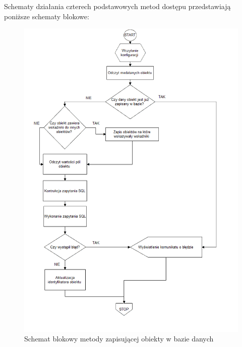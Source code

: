 \documentclass[12pt]{report}
\begin{document}
Schematy działania czterech podstawowych metod dostępu przedstawiają po\-niższe schematy blokowe:

\newpage
\begin{figure}[H]
\centering
\includegraphics[width=\textwidth]{resources/store_schema.png}
\caption{Schemat blokowy metody zapisującej obiekty w bazie danych}
\end{figure}
\end{document}
